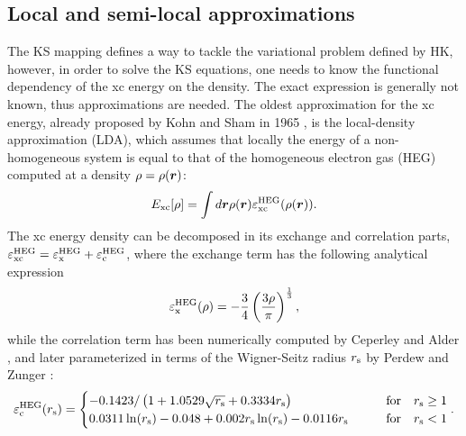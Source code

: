 \subsection{Local and semi-local approximations\label{sec:dft-approx}}
The KS mapping defines a way to tackle the variational problem defined by HK, however, in order to solve the KS equations, one needs to know the functional dependency of the xc energy on the density. The exact expression is generally not known, thus approximations are needed. The oldest approximation for the xc energy, already proposed by Kohn and Sham in 1965 \cite{kohn_self-consistent_1965}, is the local-density approximation (LDA), which assumes that locally the energy of a non-homogeneous system is equal to that of the homogeneous electron gas (HEG) computed at a density $\rho = \rho({\bm r})$:
%
\begin{equation}
    E_{\rm xc}[\rho] = \int d{\bm r} \rho({\bm r}) \varepsilon^{\rm HEG}_{\rm xc}(\rho({\bm r})) .
    \label{eq:lda-xc}
\end{equation}
%
The xc energy density can be decomposed in its exchange and correlation parts, $\varepsilon^{\rm HEG}_{\rm xc} = \varepsilon^{\rm HEG}_{\rm x} + \varepsilon^{\rm HEG}_{\rm c}$, where the exchange term has the following analytical expression
%
\begin{equation}
    \varepsilon^{\rm HEG}_{\rm x}(\rho) = - \frac{3}{4} \left( \frac{3\rho}{\pi} \right)^{\frac{1}{3}} ,
    \label{eq:lda-ex}
\end{equation}
%
while the correlation term has been numerically computed by Ceperley and Alder \cite{ceperley_ground_1980}, and later parameterized in terms of the Wigner-Seitz radius $r_{\rm s}$ by Perdew and Zunger \cite{perdew_self-interaction_1981}:
%
\begin{equation}
    \varepsilon^{\rm HEG}_{\rm c}(r_{\rm s}) =
    \begin{cases}
        -0.1423 / \left( 1 + 1.0529\sqrt{r_{\rm s}} + 0.3334 r_{\rm s} \right) & \text{for} \quad r_{\rm s} \geq 1 \\
        0.0311 \ln(r_{\rm s}) - 0.048 + 0.002 r_{\rm s} \ln(r_{\rm s}) - 0.0116 r_{\rm s} \qquad & \text{for} \quad r_{\rm s} < 1
    \end{cases} .
    \label{eq:lda-corr}
\end{equation}

